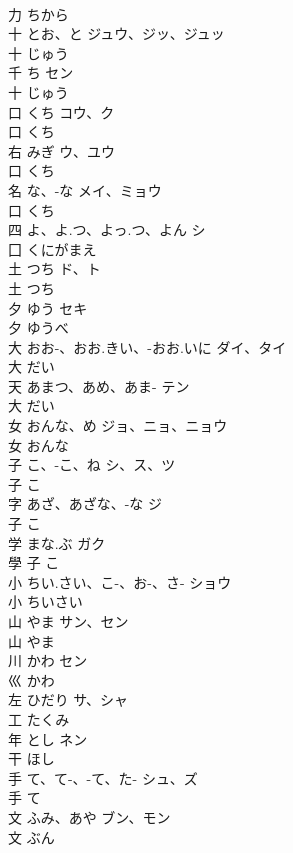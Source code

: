 \documentclass[8pt]{extreport}
\begin{document}
\begin{CJK}{UTF8}{min}
\\	力		ちから		
\\	十	とお、と	ジュウ、ジッ、ジュッ	
\\	十		じゅう		
\\	千	ち	セン	
\\	十		じゅう		
\\	口	くち	コウ、ク	
\\	口		くち		
\\	右	みぎ	ウ、ユウ	
\\	口		くち		
\\	名	な、-な	メイ、ミョウ	
\\	口		くち		
\\	四	よ、よ.つ、よっ.つ、よん	シ	
\\	囗		くにがまえ		
\\	土	つち	ド、ト	
\\	土		つち		
\\	夕	ゆう	セキ	
\\	夕		ゆうべ		
\\	大	おお-、おお.きい、-おお.いに	ダイ、タイ	
\\	大		だい		
\\	天	あまつ、あめ、あま-	テン	
\\	大		だい		
\\	女	おんな、め	ジョ、ニョ、ニョウ	
\\	女		おんな		
\\	子	こ、-こ、ね	シ、ス、ツ	
\\	子		こ		
\\	字	あざ、あざな、-な	ジ	
\\	子		こ		
\\	学	まな.ぶ	ガク	
\\	學	子		こ		
\\	小	ちい.さい、こ-、お-、さ-	ショウ	
\\	小		ちいさい		
\\	山	やま	サン、セン	
\\	山		やま		
\\	川	かわ	セン	
\\	巛		かわ		
\\	左	ひだり	サ、シャ	
\\	工		たくみ		
\\	年	とし	ネン	
\\	干		ほし		
\\	手	て、て-、-て、た-	シュ、ズ	
\\	手		て		
\\	文	ふみ、あや	ブン、モン	
\\	文		ぶん		

\end{CJK}
\end{document}
